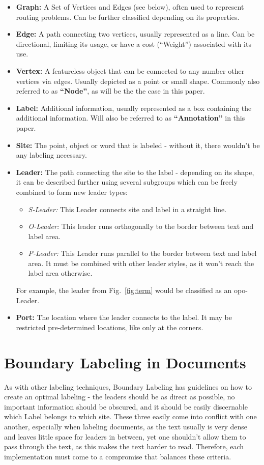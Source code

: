 \documentclass[11pt,a4paper]{article}
\begin{document}
\begin{itemize}
 \item \textbf{Graph:} A Set of Vertices and Edges (see below), often used to represent routing problems. Can be further classified depending on its properties.
 \item \textbf{Edge:} A path connecting two vertices, usually represented as a line. Can be directional, limiting its usage, or have a cost (``Weight'') associated with its use.
 \item \textbf{Vertex:} A featureless object that can be connected to any number other vertices via edges. Usually depicted as a point or small shape. Commonly also referred to as \textbf{``Node''}, as will be the the case in this paper.
 \item \textbf{Label:} Additional information, usually represented as a box containing the additional information. Will also be referred to as \textbf{``Annotation''} in this paper.
 \item \textbf{Site:} The point, object or word that is labeled - without it, there wouldn't be any labeling necessary.
 \item \textbf{Leader:} The path connecting the site to the label - depending on its shape, it can be described further using several subgroups which can be freely combined to form new leader types:
  \begin{itemize}
   \item \textit{S-Leader:} This Leader connects site and label in a straight line.
   \item \textit{O-Leader:} This leader runs orthogonally to the border between text and label area.
   \item \textit{P-Leader:} This Leader runs parallel to the border between text and label area. It must be combined with other leader styles, as it won't reach the label area otherwise.
  \end{itemize}
    For example, the leader from Fig.~\ref{fig:term} would be classified as an opo-Leader.
 \item \textbf{Port:} The location where the leader connects to the label. It may be restricted pre-determined locations, like only at the corners.
\end{itemize}

\section{Boundary Labeling in Documents}%
As with other labeling techniques, Boundary Labeling has guidelines on how to create an optimal labeling - the leaders should be as direct as possible, no important information should be obscured, and it should be easily discernable which Label belongs to which site. These three easily come into conflict with one another, especially when labeling documents, as the text usually is very dense and leaves little space for leaders in between, yet one shouldn't allow them to pass through the text, as this makes the text harder to read. Therefore, each implementation must come to a compromise that balances these criteria.
\end{document}

